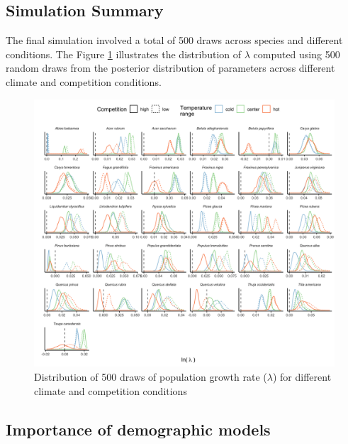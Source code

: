 \hypertarget{simulation-summary}{%
\subsection{Simulation Summary}\label{simulation-summary}}

The final simulation involved a total of 500 draws across species and
different conditions. The Figure \ref{fig:lambdaDist} illustrates the
distribution of \(\lambda\) computed using 500 random draws from the
posterior distribution of parameters across different climate and
competition conditions.\\

\hypertarget{fig:lambdaDist}{%
\begin{figure}
\centering
\includegraphics{manuscript/figs/fig-lambdaDist-1.png}
\caption[{Distribution of 500 draws of population growth rate
(\(\lambda\)) for different climate and competition
conditions}]{Distribution of 500 draws of population growth rate
(\(\lambda\)) for different climate and competition conditions}
\label{fig:lambdaDist}
\end{figure}
}

\hypertarget{importance-of-demographic-models}{%
\subsection{Importance of demographic
models}\label{importance-of-demographic-models}}


